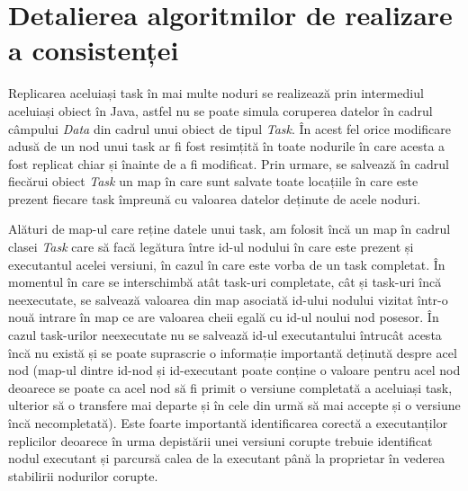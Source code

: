 \documentclass[12pt,a4paper]{report}
\begin{document}
\section{Detalierea algoritmilor de realizare a consistenței}  \label{algoritmi}
Replicarea aceluiași task în mai multe noduri se realizează prin intermediul aceluiași obiect în Java, astfel nu se poate simula coruperea datelor în cadrul câmpului \textit{Data} din cadrul unui obiect de tipul \textit{Task}. În acest fel orice modificare adusă de un nod unui task ar fi fost resimțită în toate nodurile în care acesta a fost replicat chiar și înainte de a fi modificat. Prin urmare, se salvează în cadrul fiecărui obiect \textit{Task} un map în care sunt salvate toate locațiile în care este prezent fiecare task împreună cu valoarea datelor deținute de acele noduri.

Alături de map-ul care reține datele unui task, am folosit încă un map în cadrul clasei \textit{Task} care să facă legătura între id-ul nodului în care este prezent și executantul acelei versiuni, în cazul în care este vorba de un task completat. În momentul în care se interschimbă atât task-uri completate, cât și task-uri încă neexecutate, se salvează valoarea din map asociată id-ului nodului vizitat într-o nouă intrare în map ce are valoarea cheii egală cu id-ul noului nod posesor. În cazul task-urilor neexecutate nu se salvează id-ul executantului întrucât acesta încă nu există și se poate suprascrie o informație importantă deținută despre acel nod (map-ul dintre id-nod și id-executant poate conține o valoare pentru acel nod deoarece se poate ca acel nod să fi primit o versiune completată a aceluiași task, ulterior să o transfere mai departe și în cele din urmă să mai accepte și o versiune încă necompletată). Este foarte importantă identificarea corectă a executanților replicilor deoarece în urma depistării unei versiuni corupte trebuie identificat nodul executant și parcursă calea de la executant până la proprietar în vederea stabilirii nodurilor corupte. 
\end{document}
